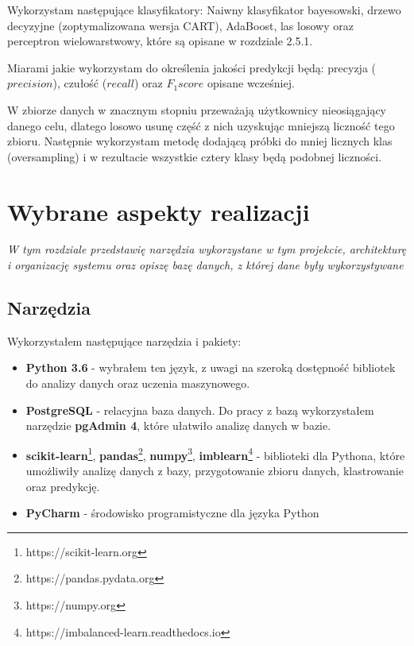 \documentclass[polish,12pt]{aghthesis}
\begin{document}
    \FloatBarrier



Wykorzystam następujące klasyfikatory: Naiwny klasyfikator bayesowski, drzewo decyzyjne (zoptymalizowana wersja CART), AdaBoost, las losowy oraz perceptron wielowarstwowy, które są opisane w rozdziale 2.5.1.

Miarami jakie wykorzystam do określenia jakości predykcji będą: precyzja ($precision$), czułość ($recall$) oraz $F_{1} score$ opisane wcześniej.

W zbiorze danych w znacznym stopniu przeważają użytkownicy nieosiągający danego celu, dlatego losowo usunę część z nich uzyskując mniejszą liczność tego zbioru. Następnie wykorzystam metodę dodającą próbki do mniej licznych klas (oversampling) i w rezultacie wszystkie cztery klasy będą podobnej liczności.


\newpage
\section{Wybrane aspekty realizacji}
\emph{W tym rozdziale przedstawię narzędzia wykorzystane w tym projekcie, architekturę i organizację systemu oraz opiszę bazę danych, z której dane były wykorzystywane}

\subsection{Narzędzia}
Wykorzystałem następujące narzędzia i pakiety:

\begin{itemize}
    \item \textbf{Python 3.6} - wybrałem ten język, z uwagi na szeroką dostępność bibliotek do analizy danych oraz uczenia maszynowego.
    \item \textbf{PostgreSQL} - relacyjna baza danych. Do pracy z bazą wykorzystałem narzędzie \textbf{pgAdmin 4}, które ułatwiło analizę danych w bazie.
    \item \textbf{scikit-learn}\footnote{https://scikit-learn.org}, \textbf{pandas}\footnote{https://pandas.pydata.org}, \textbf{numpy}\footnote{https://numpy.org}, \textbf{imblearn}\footnote{https://imbalanced-learn.readthedocs.io} - biblioteki dla Pythona, które umożliwiły analizę danych z bazy, przygotowanie zbioru danych, klastrowanie oraz predykcję.
    \item \textbf{PyCharm} - środowisko programistyczne dla języka Python
\end{itemize}
\end{document}

